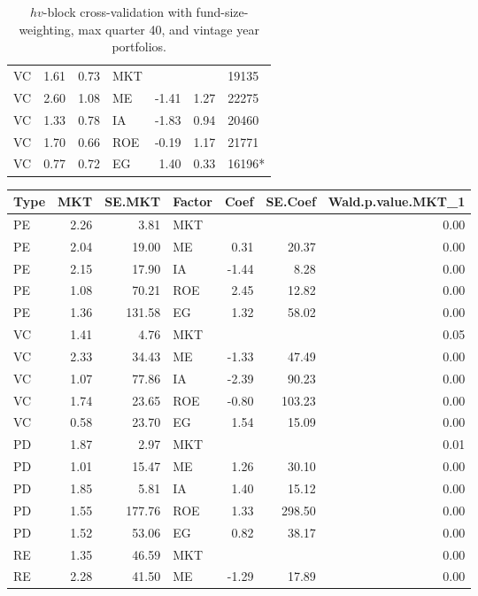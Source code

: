 \documentclass[12pt]{article}
\begin{document}
\begin{table}[ht]
\begin{tabular}{lrrlrrl}
		\hline
		VC & 1.61 & 0.73 & MKT &  &  & 19135 \\ 
		VC & 2.60 & 1.08 & ME & -1.41 & 1.27 & 22275 \\ 
		VC & 1.33 & 0.78 & IA & -1.83 & 0.94 & 20460 \\ 
		VC & 1.70 & 0.66 & ROE & -0.19 & 1.17 & 21771 \\ 
		VC & 0.77 & 0.72 & EG & 1.40 & 0.33 & 16196* \\ 
		\hline
		\hline
	\end{tabular}
	\caption{$hv$-block cross-validation with fund-size-weighting, max quarter 40, and vintage year portfolios.} 
	\label{tab:cv_40_fw_dep_vyp}
\end{table}


\begin{table}[ht]
	\centering
	\begin{tabular}{lrrlrrr}
		Type & MKT & SE.MKT & Factor & Coef & SE.Coef & Wald.p.value.MKT\_1 \\ 
		\hline
		\hline
		PE & 2.26 & 3.81 & MKT &  &  & 0.00 \\ 
		PE & 2.04 & 19.00 & ME & 0.31 & 20.37 & 0.00 \\ 
		PE & 2.15 & 17.90 & IA & -1.44 & 8.28 & 0.00 \\ 
		PE & 1.08 & 70.21 & ROE & 2.45 & 12.82 & 0.00 \\ 
		PE & 1.36 & 131.58 & EG & 1.32 & 58.02 & 0.00 \\ 
		\hline
		VC & 1.41 & 4.76 & MKT &  &  & 0.05 \\ 
		VC & 2.33 & 34.43 & ME & -1.33 & 47.49 & 0.00 \\ 
		VC & 1.07 & 77.86 & IA & -2.39 & 90.23 & 0.00 \\ 
		VC & 1.74 & 23.65 & ROE & -0.80 & 103.23 & 0.00 \\ 
		VC & 0.58 & 23.70 & EG & 1.54 & 15.09 & 0.00 \\ 
		\hline
		PD & 1.87 & 2.97 & MKT &  &  & 0.01 \\ 
		PD & 1.01 & 15.47 & ME & 1.26 & 30.10 & 0.00 \\ 
		PD & 1.85 & 5.81 & IA & 1.40 & 15.12 & 0.00 \\ 
		PD & 1.55 & 177.76 & ROE & 1.33 & 298.50 & 0.00 \\ 
		PD & 1.52 & 53.06 & EG & 0.82 & 38.17 & 0.00 \\ 
		\hline
		RE & 1.35 & 46.59 & MKT &  &  & 0.00 \\ 
		RE & 2.28 & 41.50 & ME & -1.29 & 17.89 & 0.00 \\ 

\end{tabular}
\end{table}
\end{document}
